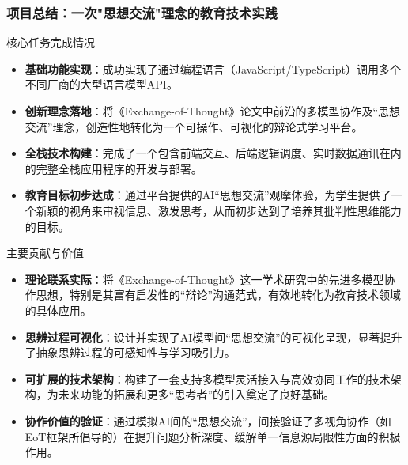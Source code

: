 \documentclass[aspectratio=169]{beamer} %
\begin{document}
\begin{frame}[allowframebreaks]
\frametitle{项目总结：一次"思想交流"理念的教育技术实践}
\begin{block}{核心任务完成情况}
\begin{itemize}
    \item \textbf{基础功能实现}：成功实现了通过编程语言（JavaScript/TypeScript）调用多个不同厂商的大型语言模型API。
    \item \textbf{创新理念落地}：将《Exchange-of-Thought》论文中前沿的多模型协作及“思想交流”理念，创造性地转化为一个可操作、可视化的辩论式学习平台。
    \item \textbf{全栈技术构建}：完成了一个包含前端交互、后端逻辑调度、实时数据通讯在内的完整全栈应用程序的开发与部署。
    \item \textbf{教育目标初步达成}：通过平台提供的AI“思想交流”观摩体验，为学生提供了一个新颖的视角来审视信息、激发思考，从而初步达到了培养其批判性思维能力的目标。
\end{itemize}
\end{block}

\begin{block}{主要贡献与价值}
\begin{itemize}
    \item \textbf{理论联系实际}：将《Exchange-of-Thought》这一学术研究中的先进多模型协作思想，特别是其富有启发性的“辩论”沟通范式，有效地转化为教育技术领域的具体应用。
    \item \textbf{思辨过程可视化}：设计并实现了AI模型间“思想交流”的可视化呈现，显著提升了抽象思辨过程的可感知性与学习吸引力。
    \item \textbf{可扩展的技术架构}：构建了一套支持多模型灵活接入与高效协同工作的技术架构，为未来功能的拓展和更多“思考者”的引入奠定了良好基础。
    \item \textbf{协作价值的验证}：通过模拟AI间的“思想交流”，间接验证了多视角协作（如EoT框架所倡导的）在提升问题分析深度、缓解单一信息源局限性方面的积极作用。
\end{itemize}
\end{block}
\end{frame}
\end{document}
